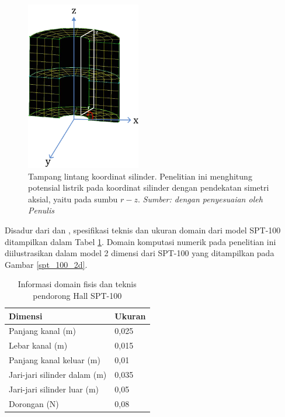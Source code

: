 \begin{figure}[h!]
    \centering
    \includegraphics[width=5cm]{gambar/silinder.png}
    \caption{Tampang lintang koordinat silinder. Penelitian ini menghitung potensial listrik pada koordinat silinder dengan pendekatan simetri aksial, yaitu pada sumbu $r-z$.\emph{ Sumber: \citep{Shiferaw2013} dengan penyesuaian oleh Penulis}}
    \label{domain_silinder}
\end{figure}

Disadur dari \cite{braga_miranda_2019} dan \cite{f_taccogna_longo_capitelli_schneider_2005}, spesifikasi teknis dan ukuran domain dari model SPT-100 ditampilkan dalam Tabel \ref{spt_100}. Domain komputasi numerik pada penelitian ini diilustrasikan dalam model 2 dimensi dari SPT-100 yang ditampilkan pada Gambar \ref{spt_100_2d}. 

\begin{table}[h!]
\centering
\caption{Informasi domain fisis dan teknis pendorong Hall SPT-100 }
\label{spt_100}
\begin{tabular}{ll}
\hline
\textbf{Dimensi}             & \textbf{Ukuran} \\ \hline
Panjang kanal (m)            & 0,025           \\ \hline
Lebar kanal (m)              & 0,015           \\ \hline
Panjang kanal keluar (m)     & 0,01            \\ \hline
Jari-jari silinder dalam (m) & 0,035           \\ \hline
Jari-jari silinder luar (m)  & 0,05            \\ \hline
Dorongan (N)                 & 0,08            \\ \hline
\end{tabular}
\end{table}

